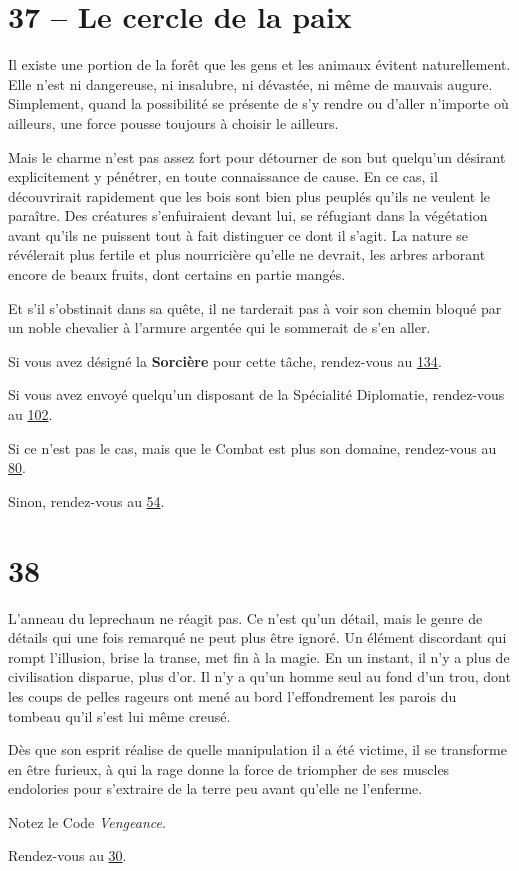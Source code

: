 \documentclass{report}
\newcommand{\gsection}[1]{
    \section{#1}
    \label{section-#1}
}
\newcommand{\glink}[1]{\hyperref[section-#1]{#1}}
\newcommand{\hero}[1]{\textbf{#1}}
\begin{document}
\gsection{37 – Le cercle de la paix}

Il existe une portion de la forêt que les gens et les animaux évitent naturellement. Elle n'est ni dangereuse, ni insalubre, ni dévastée, ni même de mauvais augure. Simplement, quand la possibilité se présente de s'y rendre ou d'aller n'importe où ailleurs, une force pousse toujours à choisir le ailleurs.

Mais le charme n'est pas assez fort pour détourner de son but quelqu'un désirant explicitement y pénétrer, en toute connaissance de cause. En ce cas, il découvrirait rapidement que les bois sont bien plus peuplés qu'ils ne veulent le paraître. Des créatures s'enfuiraient devant lui, se réfugiant dans la végétation avant qu'ils ne puissent tout à fait distinguer ce dont il s'agit. La nature se révélerait plus fertile et plus nourricière qu'elle ne devrait, les arbres arborant encore de beaux fruits, dont certains en partie mangés.

Et s'il s'obstinait dans sa quête, il ne tarderait pas à voir son chemin bloqué par un noble chevalier à l'armure argentée qui le sommerait de s'en aller.

Si vous avez désigné la \hero{Sorcière} pour cette tâche, rendez-vous au \glink{134}.

Si vous avez envoyé quelqu'un disposant de la Spécialité Diplomatie, rendez-vous au \glink{102}.

Si ce n'est pas le cas, mais que le Combat est plus son domaine, rendez-vous au \glink{80}.

Sinon, rendez-vous au \glink{54}.

\gsection{38}

L'anneau du leprechaun ne réagit pas. Ce n'est qu'un détail, mais le genre de détails qui une fois remarqué ne peut plus être ignoré. Un élément discordant qui rompt l'illusion, brise la transe, met fin à la magie. En un instant, il n'y a plus de civilisation disparue, plus d'or. Il n'y a qu'un homme seul au fond d'un trou, dont les coups de pelles rageurs ont mené au bord l'effondrement les parois du tombeau qu'il s'est lui même creusé.

Dès que son esprit réalise de quelle manipulation il a été victime, il se transforme en être furieux, à qui la rage donne la force de triompher de ses muscles endolories pour s'extraire de la terre peu avant qu'elle ne l'enferme.

Notez le Code \emph{Vengeance}.

Rendez-vous au \glink{30}.
\end{document}

